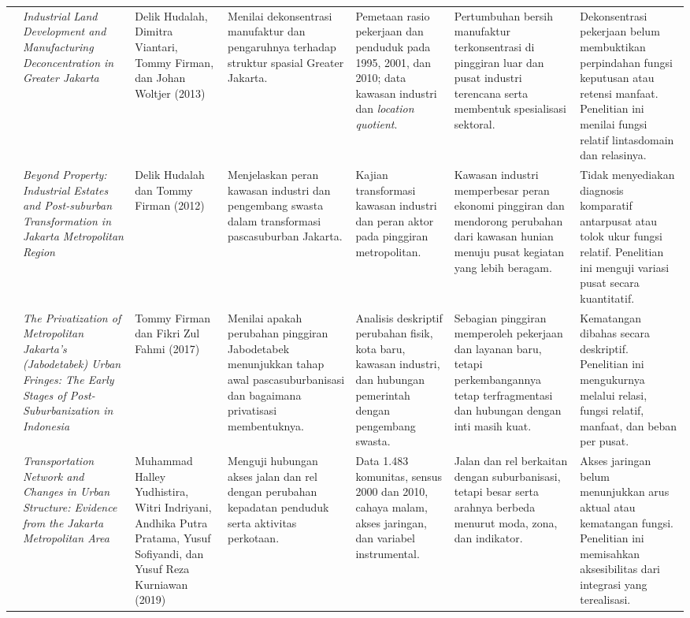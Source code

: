 \documentclass[11pt,a4paper,oneside,openany,indonesian]{report}
\begin{document}
\begin{landscape}
\begin{longtable}{>{\centering\arraybackslash}p{0.55cm}p{3.4cm}p{3.0cm}p{3.6cm}p{3.9cm}p{4.0cm}p{4.5cm}}
3 & \textit{Industrial Land Development and Manufacturing Deconcentration in Greater Jakarta} & Delik Hudalah, Dimitra Viantari, Tommy Firman, dan Johan Woltjer (2013) & Menilai dekonsentrasi manufaktur dan pengaruhnya terhadap struktur spasial Greater Jakarta. & Pemetaan rasio pekerjaan dan penduduk pada 1995, 2001, dan 2010; data kawasan industri dan \textit{location quotient}. & Pertumbuhan bersih manufaktur terkonsentrasi di pinggiran luar dan pusat industri terencana serta membentuk spesialisasi sektoral. & Dekonsentrasi pekerjaan belum membuktikan perpindahan fungsi keputusan atau retensi manfaat. Penelitian ini menilai fungsi relatif lintasdomain dan relasinya.\\
4 & \textit{Beyond Property: Industrial Estates and Post-suburban Transformation in Jakarta Metropolitan Region} & Delik Hudalah dan Tommy Firman (2012) & Menjelaskan peran kawasan industri dan pengembang swasta dalam transformasi pascasuburban Jakarta. & Kajian transformasi kawasan industri dan peran aktor pada pinggiran metropolitan. & Kawasan industri memperbesar peran ekonomi pinggiran dan mendorong perubahan dari kawasan hunian menuju pusat kegiatan yang lebih beragam. & Tidak menyediakan diagnosis komparatif antarpusat atau tolok ukur fungsi relatif. Penelitian ini menguji variasi pusat secara kuantitatif.\\
5 & \textit{The Privatization of Metropolitan Jakarta's (Jabodetabek) Urban Fringes: The Early Stages of Post-Suburbanization in Indonesia} & Tommy Firman dan Fikri Zul Fahmi (2017) & Menilai apakah perubahan pinggiran Jabodetabek menunjukkan tahap awal pascasuburbanisasi dan bagaimana privatisasi membentuknya. & Analisis deskriptif perubahan fisik, kota baru, kawasan industri, dan hubungan pemerintah dengan pengembang swasta. & Sebagian pinggiran memperoleh pekerjaan dan layanan baru, tetapi perkembangannya tetap terfragmentasi dan hubungan dengan inti masih kuat. & Kematangan dibahas secara deskriptif. Penelitian ini mengukurnya melalui relasi, fungsi relatif, manfaat, dan beban per pusat.\\
6 & \textit{Transportation Network and Changes in Urban Structure: Evidence from the Jakarta Metropolitan Area} & Muhammad Halley Yudhistira, Witri Indriyani, Andhika Putra Pratama, Yusuf Sofiyandi, dan Yusuf Reza Kurniawan (2019) & Menguji hubungan akses jalan dan rel dengan perubahan kepadatan penduduk serta aktivitas perkotaan. & Data 1.483 komunitas, sensus 2000 dan 2010, cahaya malam, akses jaringan, dan variabel instrumental. & Jalan dan rel berkaitan dengan suburbanisasi, tetapi besar serta arahnya berbeda menurut moda, zona, dan indikator. & Akses jaringan belum menunjukkan arus aktual atau kematangan fungsi. Penelitian ini memisahkan aksesibilitas dari integrasi yang terealisasi.\\

\end{longtable}
\end{landscape}
\end{document}
